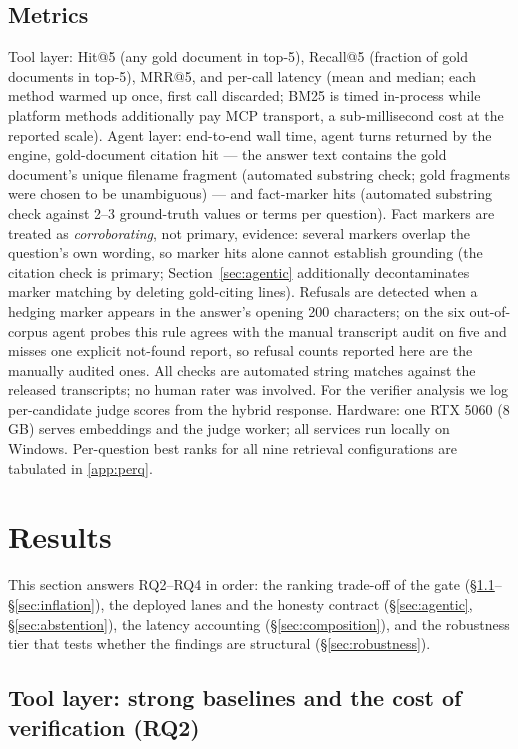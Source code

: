 \subsection{Metrics}
Tool layer: Hit@5 (any gold document in top-5), Recall@5 (fraction of gold
documents in top-5), MRR@5, and per-call latency (mean and median; each
method warmed up once, first call discarded; BM25 is timed in-process
while platform methods additionally pay MCP transport, a sub-millisecond
cost at the reported scale). Agent layer: end-to-end wall
time, agent turns returned by the engine, gold-document citation hit ---
the answer text contains the gold document's unique filename fragment
(automated substring check; gold fragments were chosen to be unambiguous) ---
and fact-marker hits (automated substring check against 2--3
ground-truth values or terms per question). Fact markers are treated as
\emph{corroborating}, not primary, evidence: several markers overlap the
question's own wording, so marker hits alone cannot establish grounding
(the citation check is primary; Section~\ref{sec:agentic} additionally
decontaminates marker matching by deleting gold-citing lines). Refusals
are detected when a hedging marker appears in the answer's opening 200
characters; on the six out-of-corpus agent probes this rule agrees with
the manual transcript audit on five and misses one explicit not-found
report, so refusal counts reported here are the manually audited ones. All checks
are automated string matches against the released transcripts; no human
rater was involved. For the verifier analysis we log per-candidate judge
scores from the hybrid response. Hardware: one RTX 5060 (8\,GB) serves
embeddings and the judge worker; all services run locally on Windows.
Per-question best ranks for all nine retrieval configurations are
tabulated in \ref{app:perq}.

\section{Results}
\label{sec:results}

This section answers RQ2--RQ4 in order: the ranking trade-off of the gate
(\S\ref{sec:retrieval}--\S\ref{sec:inflation}), the deployed lanes and the
honesty contract (\S\ref{sec:agentic}, \S\ref{sec:abstention}), the latency
accounting (\S\ref{sec:composition}), and the robustness tier that tests
whether the findings are structural (\S\ref{sec:robustness}).

\subsection{Tool layer: strong baselines and the cost of verification (RQ2)}
\label{sec:retrieval}

